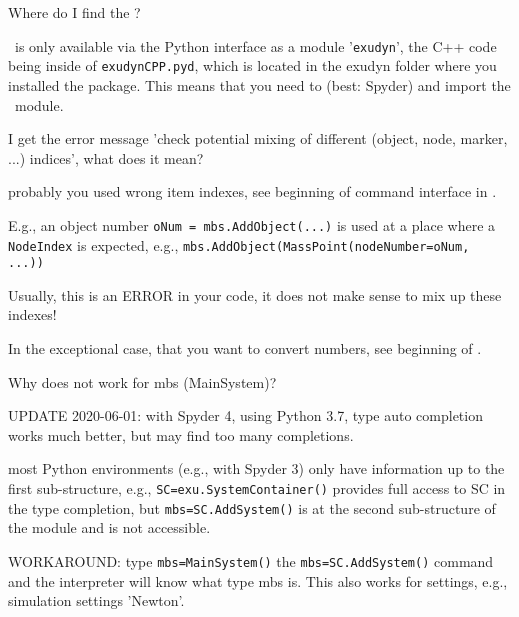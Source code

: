 \item Where do I find the ?
\bi
\item[$\ra$] \codeName\ is only available via the Python interface as a module '\texttt{exudyn}', the C++ code being inside of \texttt{exudynCPP.pyd}, which is located in the exudyn folder where you installed the package. This means that you need to  (best: Spyder) and import the \codeName\ module.
\ei
\item I get the error message 'check potential mixing of different (object, node, marker, ...) indices', what does it mean?
\bi
\item[$\ra$] probably you used wrong item indexes, see beginning of command interface in . 
\item[$\ra$] E.g., an object number \texttt{oNum = mbs.AddObject(...)} is used at a place where a \texttt{NodeIndex} is expected, e.g., \texttt{mbs.AddObject(MassPoint(nodeNumber=oNum, ...))}
\item[$\ra$] Usually, this is an ERROR in your code, it does not make sense to mix up these indexes!
\item[$\ra$] In the exceptional case, that you want to convert numbers, see beginning of .
\ei
\item Why does  not work for mbs (MainSystem)?
\bi
\item[$\ra$] UPDATE 2020-06-01: with Spyder 4, using Python 3.7, type auto completion works much better, but may find too many completions.
\item[$\ra$] most Python environments (e.g., with Spyder 3) only have information up to the first sub-structure, e.g., \texttt{SC=exu.SystemContainer()} provides full access to SC in the type completion, but \texttt{mbs=SC.AddSystem()} is at the second sub-structure of the module and is not accessible.
\item[$\ra$] WORKAROUND: type \texttt{mbs=MainSystem()}  the \texttt{mbs=SC.AddSystem()} command and the interpreter will know what type mbs is. This also works for settings, e.g., simulation settings 'Newton'.
